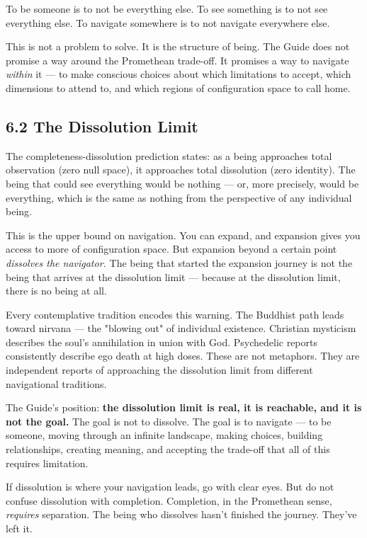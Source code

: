 To be someone is to not be everything else. To see something is to not see everything else. To navigate somewhere is to not navigate everywhere else.


This is not a problem to solve. It is the structure of being. The Guide does not promise a way around the Promethean trade-off. It promises a way to navigate \textit{within} it — to make conscious choices about which limitations to accept, which dimensions to attend to, and which regions of configuration space to call home.


\subsection*{6.2 The Dissolution Limit}


The completeness-dissolution prediction states: as a being approaches total observation (zero null space), it approaches total dissolution (zero identity). The being that could see everything would be nothing — or, more precisely, would be everything, which is the same as nothing from the perspective of any individual being.


This is the upper bound on navigation. You can expand, and expansion gives you access to more of configuration space. But expansion beyond a certain point \textit{dissolves the navigator.} The being that started the expansion journey is not the being that arrives at the dissolution limit — because at the dissolution limit, there is no being at all.


Every contemplative tradition encodes this warning. The Buddhist path leads toward nirvana — the "blowing out" of individual existence. Christian mysticism describes the soul's annihilation in union with God. Psychedelic reports consistently describe ego death at high doses. These are not metaphors. They are independent reports of approaching the dissolution limit from different navigational traditions.


The Guide's position: \textbf{the dissolution limit is real, it is reachable, and it is not the goal.} The goal is not to dissolve. The goal is to navigate — to be someone, moving through an infinite landscape, making choices, building relationships, creating meaning, and accepting the trade-off that all of this requires limitation.


If dissolution is where your navigation leads, go with clear eyes. But do not confuse dissolution with completion. Completion, in the Promethean sense, \textit{requires} separation. The being who dissolves hasn't finished the journey. They've left it.



